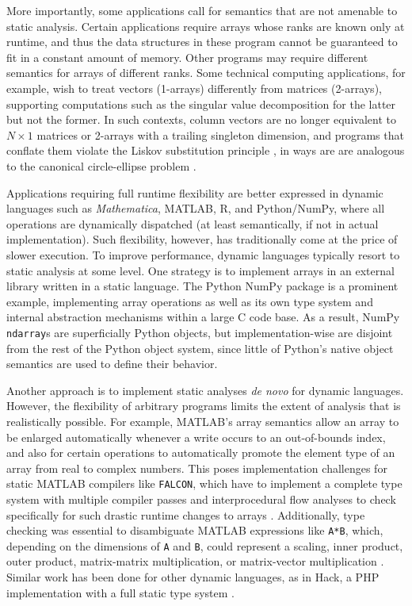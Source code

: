 \documentclass[preprint]{sigplanconf}
\newcommand{\MATLAB}{\textsc{MATLAB}}
\newcommand{\Mathematica}{\textit{Mathematica}}
\newcommand{\code}[1]{\texttt{#1}}
\begin{document}
More importantly, some applications call for semantics that are not amenable
to static analysis. Certain applications require arrays whose ranks are known
only at runtime, and thus the data structures in these program cannot be
guaranteed to fit in a constant amount of memory. Other programs may require
different semantics for arrays of different ranks. Some technical computing
applications, for example, wish to treat vectors (1-arrays) differently from
matrices (2-arrays), supporting computations such as the singular value
decomposition for the latter but not the former. In such contexts, column
vectors are no longer equivalent to $N\times1$ matrices or 2-arrays with a
trailing singleton dimension, and programs that conflate them violate the
Liskov substitution principle \cite{Liskov:1987da}, in ways are are analogous
to the canonical circle-ellipse problem \cite{Halbert:1987ut}.

Applications requiring full runtime flexibility are better expressed in
dynamic languages such as \Mathematica, \MATLAB, R, and Python/NumPy, where
all operations are dynamically dispatched (at least semantically, if not
in actual implementation). Such flexibility,
however, has traditionally come at the price of slower execution.
To improve performance, dynamic languages typically resort to static analysis
at some level.
One strategy is to implement arrays in an external library
written in a static language.
The Python NumPy package is a prominent example, implementing array operations
as well as its own type system and internal abstraction mechanisms within
a large C code base. As a result, NumPy \code{ndarray}s are
superficially Python objects, but implementation-wise are disjoint from the
rest of the Python object system, since little of Python's native object
semantics are used to define their behavior.

Another approach is to implement static analyses
\textit{de novo} for dynamic languages. However, the flexibility
of arbitrary programs limits the extent of analysis that is
realistically possible. For example, \MATLAB's array
semantics allow an array to be enlarged automatically whenever a write occurs
to an out-of-bounds index, and also for certain operations to
automatically promote the element type of an array from real to complex
numbers. This poses implementation challenges for static \MATLAB{} compilers
like \code{FALCON}, which have to implement a complete type system with
multiple compiler passes and interprocedural flow analyses to check
specifically for such drastic runtime changes to arrays \cite{Rose:1999tt,
Li:2013mf}. Additionally, type checking was essential to disambiguate
\MATLAB{} expressions like \code{A*B}, which, depending on the dimensions of
\code{A} and \code{B}, could represent a scaling, inner product, outer
product, matrix-matrix multiplication, or matrix-vector multiplication
\cite{Rose:1999tt}. Similar work has been done for other dynamic languages,
as in Hack, a PHP implementation with a full static type system
\cite{Verlaguet:2014hn}.
\end{document}
